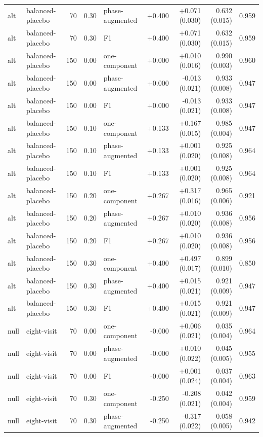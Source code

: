 \documentclass[
  11pt,
]{article}
\begin{document}
\begin{longtable}[t]{llrrlrrrr}
alt & balanced-placebo & 70 & 0.30 & phase-augmented & +0.400 & +0.071 (0.030) & 0.632 (0.015) & 0.959\\
alt & balanced-placebo & 70 & 0.30 & F1 & +0.400 & +0.071 (0.030) & 0.632 (0.015) & 0.959\\
alt & balanced-placebo & 150 & 0.00 & one-component & +0.000 & +0.010 (0.016) & 0.990 (0.003) & 0.960\\
\addlinespace
alt & balanced-placebo & 150 & 0.00 & phase-augmented & +0.000 & -0.013 (0.021) & 0.933 (0.008) & 0.947\\
alt & balanced-placebo & 150 & 0.00 & F1 & +0.000 & -0.013 (0.021) & 0.933 (0.008) & 0.947\\
alt & balanced-placebo & 150 & 0.10 & one-component & +0.133 & +0.167 (0.015) & 0.985 (0.004) & 0.947\\
alt & balanced-placebo & 150 & 0.10 & phase-augmented & +0.133 & +0.001 (0.020) & 0.925 (0.008) & 0.964\\
alt & balanced-placebo & 150 & 0.10 & F1 & +0.133 & +0.001 (0.020) & 0.925 (0.008) & 0.964\\
\addlinespace
alt & balanced-placebo & 150 & 0.20 & one-component & +0.267 & +0.317 (0.016) & 0.965 (0.006) & 0.921\\
alt & balanced-placebo & 150 & 0.20 & phase-augmented & +0.267 & +0.010 (0.020) & 0.936 (0.008) & 0.956\\
alt & balanced-placebo & 150 & 0.20 & F1 & +0.267 & +0.010 (0.020) & 0.936 (0.008) & 0.956\\
alt & balanced-placebo & 150 & 0.30 & one-component & +0.400 & +0.497 (0.017) & 0.899 (0.010) & 0.850\\
alt & balanced-placebo & 150 & 0.30 & phase-augmented & +0.400 & +0.015 (0.021) & 0.921 (0.009) & 0.947\\
\addlinespace
alt & balanced-placebo & 150 & 0.30 & F1 & +0.400 & +0.015 (0.021) & 0.921 (0.009) & 0.947\\
null & eight-visit & 70 & 0.00 & one-component & -0.000 & +0.006 (0.021) & 0.035 (0.004) & 0.964\\
null & eight-visit & 70 & 0.00 & phase-augmented & -0.000 & +0.010 (0.022) & 0.045 (0.005) & 0.955\\
null & eight-visit & 70 & 0.00 & F1 & -0.000 & +0.001 (0.024) & 0.037 (0.004) & 0.963\\
null & eight-visit & 70 & 0.30 & one-component & -0.250 & -0.208 (0.021) & 0.042 (0.004) & 0.959\\
\addlinespace
null & eight-visit & 70 & 0.30 & phase-augmented & -0.250 & -0.317 (0.022) & 0.058 (0.005) & 0.942\\

\end{longtable}
\end{document}
